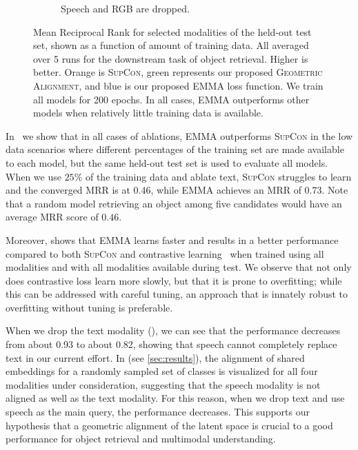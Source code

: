 \documentclass[sigconf,natbib=true,anonymous=true]{acmart}
\newcommand{\todokdinline}[1]{\todo[color=red!20,inline]{{KD: \small #1}}}
\newcommand{\ours}{\textsc{EMMA}}
\newcommand{\geom}{\textsc{Geometric Alignment}}
\newcommand{\supcon}{\textsc{SupCon}}
\begin{document}
\begin{figure}
\begin{subfigure}[b]{0.49\columnwidth}
        \caption[]{Speech and RGB are dropped.}    
        \label{fig:partial-mrr.ld}
    \end{subfigure}
    \caption[]
    {Mean Reciprocal Rank for selected modalities of the held-out test set, shown as a function of amount of training data. All averaged over 5 runs for the downstream task of object retrieval. Higher is better. 
    Orange is \supcon{}, green represents our proposed \geom{}, and blue is our proposed \ours{} loss function. We train all models for 200 epochs.
    In all cases, \ours{} outperforms other models when relatively little training data is available.
    } 
    \label{fig:partial-data-result-graphs}
\end{figure}
%     

% 

In~ we show that in all cases of ablations, \ours{} outperforms \supcon{} in the low data scenarios where different percentages of the training set are made available to each model, but the same held-out test set is used to evaluate all models. When we use $25\%$ of the training data and ablate text, \supcon{} struggles to learn and the converged MRR is at 0.46, while \ours{} achieves an MRR of 0.73. Note that a random model retrieving an object among five candidates would have an average MRR score of $0.46$.

Moreover,  shows that \ours{} learns faster and results in a better performance compared to both \supcon{} and contrastive learning~\citep{chen2020simple} when trained using all modalities and with all modalities available during test. We observe that not only does contrastive loss learn more slowly, but that it is prone to overfitting; while this can be addressed with careful tuning, an approach that is innately robust to overfitting without tuning is preferable.

When we drop the text modality (), we can see that the performance decreases from about 0.93 to about 0.82, showing that speech cannot completely replace text in our current effort. In  (see \cref{sec:results}), the alignment of shared embeddings for a randomly sampled set of classes is visualized for all four modalities under consideration, suggesting that the speech modality is not aligned as well as the text modality. For this reason, when we drop text and use speech as the main query, the performance decreases. This supports our hypothesis that a geometric alignment of the latent space is crucial to a good performance for object retrieval and multimodal understanding.
\end{document}

